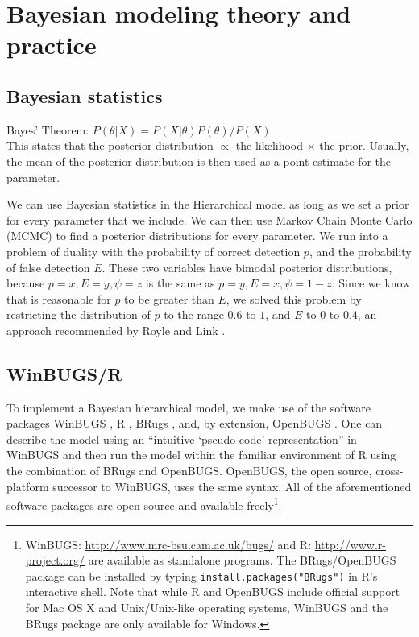 \documentclass[12pt]{article}
\begin{document}
\section{Bayesian modeling theory and practice}

    \subsection{Bayesian statistics}
    Bayes' Theorem: \(P(\theta|X) = P(X|\theta)P(\theta) / P(X)\) \\

    This states that the posterior distribution \(\propto\) the likelihood
    \(\times\) the prior. Usually, the mean of the posterior distribution is
    then used as a point estimate for the parameter.

    We can use Bayesian statistics in the Hierarchical model as long as we set a
    prior for every parameter that we include. We can then use Markov Chain
    Monte Carlo (MCMC) to find a posterior distributions for every parameter. We
    run into a problem of duality with the probability of correct detection
    \(p\), and the probability of false detection \(E\). These two variables
    have bimodal posterior distributions, because \(p=x,E=y,\psi=z\) is the same
    as \(p=y,E=x,\psi=1-z\). Since we know that is reasonable for \(p\) to be
    greater than \(E\), we solved this problem by restricting the distribution
    of \(p\) to the range \(0.6\text{ to }1\), and \(E\) to \(0\text{ to }0.4\),  
    an approach recommended by Royle and Link \cite{Royle2006}. 

    \subsection{WinBUGS/R}
    To implement a Bayesian hierarchical model, we make use of the software
    packages WinBUGS \cite{Lunn2000}, R \cite{R2009}, BRugs \cite{Thomas2008},
    and, by extension, OpenBUGS \cite{Thomas2006}. One can describe the model
    using an ``intuitive `pseudo-code' representation'' in WinBUGS
    \cite{MacKenzie2006} and then run the model within the familiar environment
    of R using the combination of BRugs and OpenBUGS. OpenBUGS, the open source,
    cross-platform successor to WinBUGS, uses the same syntax. All of the
    aforementioned software packages are open source and available
    freely\footnote{WinBUGS: \url{http://www.mrc-bsu.cam.ac.uk/bugs/} and R:
    \url{http://www.r-project.org/} are available as standalone programs. The
    BRugs/OpenBUGS package can be installed by typing
    \texttt{install.packages("BRugs")} in R's interactive shell. Note that while
    R and OpenBUGS include official support for Mac OS X and Unix/Unix-like
    operating systems, WinBUGS and the BRugs package are only available for
    Windows.}.
\end{document}
